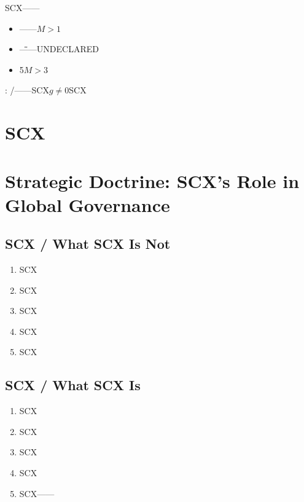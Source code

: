 \documentclass[12pt,a4paper]{article}
\theoremstyle{remark}
\begin{document}
SCX——\textbf{}

\begin{itemize}[nosep]
    \item ——$M>1$
    \item \"\"——UNDECLARED
    \item 5$M>3$
\end{itemize}

\textbf{}: /——SCX$g \neq 0$SCX


\section{SCX}
\section{Strategic Doctrine: SCX's Role in Global Governance}

\subsection{SCX / What SCX Is Not}

\begin{warningbox}[title=\textbf{SCX / Strategic Negatives}]
    \begin{enumerate}[label=(\arabic*)]
        \item SCX
        \item SCX
        \item SCX
        \item SCX
        \item SCX\textbf{}
    \end{enumerate}
\end{warningbox}

\subsection{SCX / What SCX Is}

\begin{keybox}[title=\textbf{SCX / Strategic Positives}]
    \begin{enumerate}[label=(\arabic*)]
        \item SCX
        \item SCX
        \item SCX
        \item SCX
        \item SCX——
    \end{enumerate}
\end{keybox}
\end{document}

